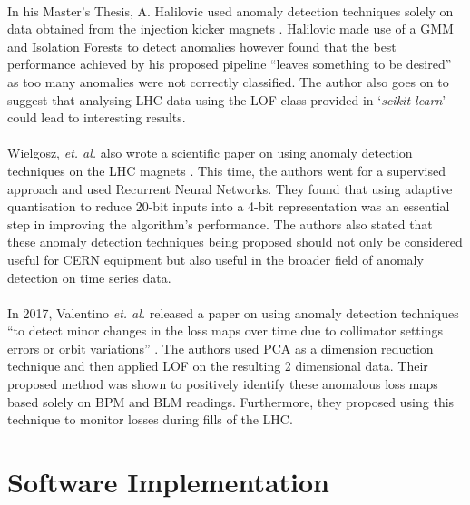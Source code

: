 \paragraph{ }In his Master's Thesis, A. Halilovic used anomaly detection techniques solely on data obtained from the injection kicker magnets \cite{Halilovic2018}. Halilovic made use of a \ac{GMM} and Isolation Forests to detect anomalies however found that the best performance achieved by his proposed pipeline ``leaves something to be desired'' as too many anomalies were not correctly classified. The author also goes on to suggest that analysing \acs{LHC} data using the \acs{LOF} class provided in `\textit{scikit-learn}' could lead to interesting results.

\paragraph{ }Wielgosz, \textit{et. al.} also wrote a scientific paper on using anomaly detection techniques on the \acs{LHC} magnets \cite{Wielgosz2017}. This time, the authors went for a supervised approach and used Recurrent Neural Networks. They found that using adaptive quantisation to reduce 20-bit inputs into a 4-bit representation was an essential step in improving the algorithm's performance. The authors also stated that these anomaly detection techniques being proposed should not only be considered useful for \acs{CERN} equipment but also useful in the broader field of anomaly detection on time series data.

\paragraph{ }In 2017, Valentino \textit{et. al.} released a paper on using anomaly detection techniques ``to detect minor changes in the loss maps over time due to collimator settings errors or orbit variations'' \cite{Valentino2017}. The authors used \acs{PCA} as a dimension reduction technique and then applied \acs{LOF} on the resulting 2 dimensional data. Their proposed method was shown to positively identify these anomalous loss maps based solely on \acs{BPM} and \acs{BLM} readings. Furthermore, they proposed using this technique to monitor losses during fills of the \acs{LHC}.

\section{Software Implementation}

